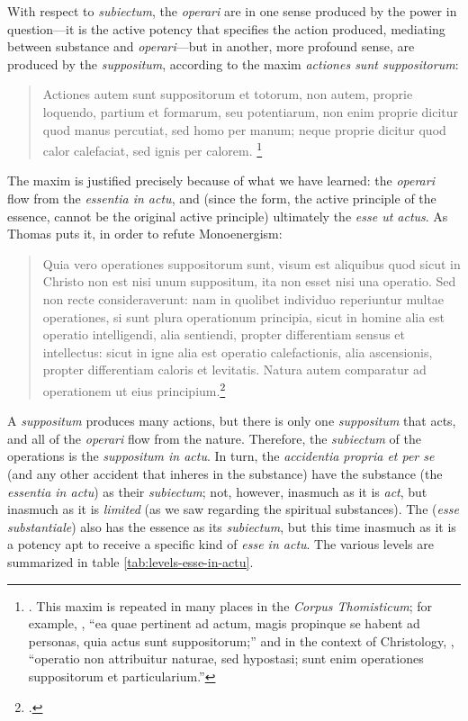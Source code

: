With respect to \emph{subiectum}, the \emph{operari} are in one sense produced by the power in question—it is the active potency that specifies the action produced, mediating between substance and   \emph{operari}—but in another, more profound sense, are produced by the \emph{suppositum}, according to the maxim \emph{actiones sunt suppositorum}:
%
\begin{quotation}
Actiones autem sunt suppositorum et totorum, non autem, proprie loquendo, partium et formarum, seu potentiarum, non enim proprie dicitur quod manus percutiat, sed homo per manum; neque proprie dicitur quod calor calefaciat, sed ignis per calorem.%
%
\footnote{\Cite[II-II, q.~58, a.~2, co.]{st:summa}. This maxim is repeated in many places in the \emph{Corpus Thomisticum}; for example, \cite[I, q.~39, a.~5]{st:summa}, “ea quae pertinent ad actum, magis propinque se habent ad personas, quia actus sunt suppositorum;” and in the context of Christology, \cite[20, a.~1, arg.~2]{st:deveritate}, “operatio non attribuitur naturae, sed hypostasi; sunt enim operationes suppositorum et particularium.”}
\end{quotation}
%
The maxim is justified precisely because of what we have learned: the \emph{operari} flow from the \emph{essentia in actu}, and (since the form, the active principle of the essence, cannot be the original active principle) ultimately the \emph{esse ut actus}. As Thomas puts it, in order to refute Monoenergism:
%
\begin{quotation}
Quia vero operationes suppositorum sunt, visum est aliquibus quod sicut in Christo non est nisi unum suppositum, ita non esset nisi una operatio. Sed non recte consideraverunt: nam in quolibet individuo reperiuntur multae operationes, si sunt plura operationum principia, sicut in homine alia est operatio intelligendi, alia sentiendi, propter differentiam sensus et intellectus: sicut in igne alia est operatio calefactionis, alia ascensionis, propter differentiam caloris et levitatis. Natura autem comparatur ad operationem ut eius principium.\footcite[I, cap.~212]{st:compendium}
\end{quotation}
%
A \emph{suppositum} produces many actions, but there is only one \emph{suppositum} that acts, and all of the \emph{operari} flow from the nature. Therefore, the \emph{subiectum} of the operations is the \emph{suppositum in actu}. In turn, the \emph{accidentia propria et per se} (and any other accident that inheres in the substance) have the substance (the \emph{essentia in actu}) as their \emph{subiectum}; not, however, inasmuch as it is \emph{act}, but inasmuch as it is \emph{limited} (as we saw regarding the spiritual substances). The (\emph{esse substantiale}) also has the essence as its \emph{subiectum}, but this time inasmuch as it is a potency apt to receive a specific kind of \emph{esse in actu}. The various levels are summarized in table \ref{tab:levels-esse-in-actu}.%
